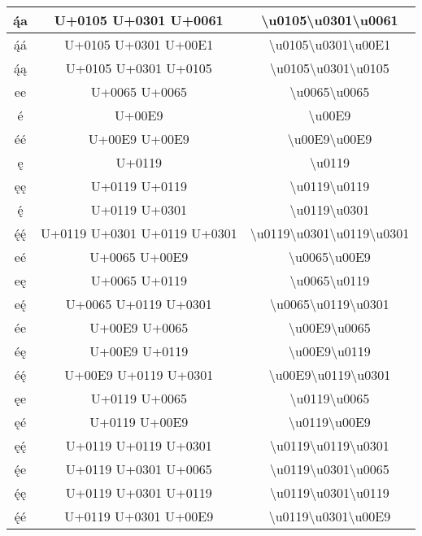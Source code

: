 \begin{longtable}{|c|c|c|}
ą́a & U+0105 U+0301 U+0061 & \textbackslash{}u0105\textbackslash{}u0301\textbackslash{}u0061 \\ \hline
ą́á & U+0105 U+0301 U+00E1 & \textbackslash{}u0105\textbackslash{}u0301\textbackslash{}u00E1 \\ \hline
ą́ą & U+0105 U+0301 U+0105 & \textbackslash{}u0105\textbackslash{}u0301\textbackslash{}u0105 \\ \hline

ee & U+0065 U+0065 & \textbackslash{}u0065\textbackslash{}u0065 \\ \hline
é & U+00E9 & \textbackslash{}u00E9 \\ \hline
éé & U+00E9 U+00E9 & \textbackslash{}u00E9\textbackslash{}u00E9 \\ \hline
ę & U+0119 & \textbackslash{}u0119 \\ \hline
ęę & U+0119 U+0119 & \textbackslash{}u0119\textbackslash{}u0119 \\ \hline
ę́ & U+0119 U+0301 & \textbackslash{}u0119\textbackslash{}u0301 \\ \hline
ę́ę́ & U+0119 U+0301 U+0119 U+0301 & \textbackslash{}u0119\textbackslash{}u0301\textbackslash{}u0119\textbackslash{}u0301 \\ \hline

eé & U+0065 U+00E9 & \textbackslash{}u0065\textbackslash{}u00E9 \\ \hline
eę & U+0065 U+0119 & \textbackslash{}u0065\textbackslash{}u0119 \\ \hline
eę́ & U+0065 U+0119 U+0301 & \textbackslash{}u0065\textbackslash{}u0119\textbackslash{}u0301 \\ \hline

ée & U+00E9 U+0065 & \textbackslash{}u00E9\textbackslash{}u0065 \\ \hline
éę & U+00E9 U+0119 & \textbackslash{}u00E9\textbackslash{}u0119 \\ \hline
éę́ & U+00E9 U+0119 U+0301 & \textbackslash{}u00E9\textbackslash{}u0119\textbackslash{}u0301 \\ \hline

ęe & U+0119 U+0065 & \textbackslash{}u0119\textbackslash{}u0065 \\ \hline
ęé & U+0119 U+00E9  & \textbackslash{}u0119\textbackslash{}u00E9 \\ \hline
ęę́ & U+0119 U+0119 U+0301 & \textbackslash{}u0119\textbackslash{}u0119\textbackslash{}u0301 \\ \hline

ę́e & U+0119 U+0301 U+0065 & \textbackslash{}u0119\textbackslash{}u0301\textbackslash{}u0065 \\ \hline
ę́ę & U+0119 U+0301 U+0119 & \textbackslash{}u0119\textbackslash{}u0301\textbackslash{}u0119 \\ \hline
ę́é & U+0119 U+0301 U+00E9  & \textbackslash{}u0119\textbackslash{}u0301\textbackslash{}u00E9 \\ \hline


\end{longtable}
